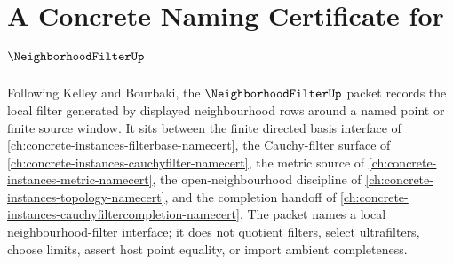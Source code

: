 \chapter{A Concrete Naming Certificate for $\NeighborhoodFilterUp$}
\label{ch:concrete-instances-neighborhood-filter-namecert}

Following Kelley and Bourbaki, the $\NeighborhoodFilterUp$ packet records the local filter generated by displayed neighbourhood rows around a named point or finite source window. It sits between the finite directed basis interface of \autoref{ch:concrete-instances-filterbase-namecert}, the Cauchy-filter surface of \autoref{ch:concrete-instances-cauchyfilter-namecert}, the metric source of \autoref{ch:concrete-instances-metric-namecert}, the open-neighbourhood discipline of \autoref{ch:concrete-instances-topology-namecert}, and the completion handoff of \autoref{ch:concrete-instances-cauchyfiltercompletion-namecert}. The packet names a local neighbourhood-filter interface; it does not quotient filters, select ultrafilters, choose limits, assert host point equality, or import ambient completeness.

